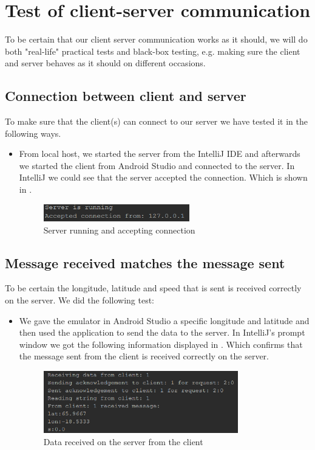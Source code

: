 \section{Test of client-server communication}
To be certain that our client server communication works as it should, we will do both "real-life" practical tests and black-box testing, e.g. making sure the client and server behaves as it should on different occasions.

\subsection{Connection between client and server}
To make sure that the client(s) can connect to our server we have tested it in the following ways.
\begin{itemize}
	\item From local host, we started the server from the IntelliJ IDE and afterwards we started the client from Android Studio and connected to the server. In IntelliJ we could see that the server accepted the connection. Which is shown in .
		\begin{figure}[h!]
  \centering
	    \includegraphics[width=0.6\textwidth]{figures/serverrunning.png}
    \caption{Server running and accepting connection}
    \label{fig:serverrunning}
\end{figure}
\end{itemize}

\subsection{Message received matches the message sent}
To be certain the longitude, latitude and speed that is sent is received correctly on the server. We did the following test:
\begin{itemize}
	\item We gave the emulator in Android Studio a specific longitude and latitude and then used the application to send the data to the server. In IntelliJ's prompt window we got the following information displayed in . Which confirms that the message sent from the client is received correctly on the server.
	\begin{figure}[h!]
  \centering
    \includegraphics[width=0.8\textwidth]{figures/datasentfromclienttoserver.png}
    \caption{Data received on the server from the client}
    \label{fig:datasentfromclienttoserver}
\end{figure}
\end{itemize}

